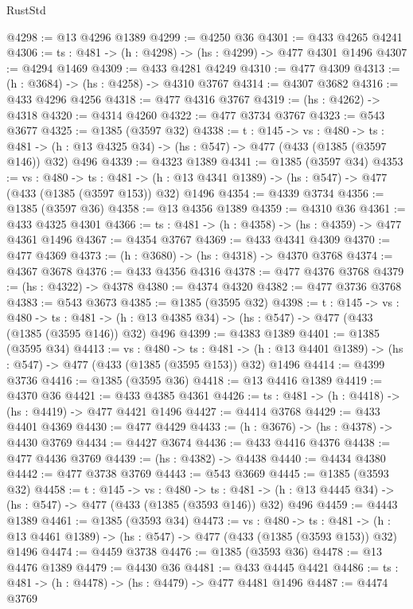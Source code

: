\begin{lexlean}{RustStd}
\begin{coremodule}
{\begin{coremodule}
{{{{{{{{{{{{{{{{@4298 := @13 @4296 @1389
@4299 := @4250 @36
@4301 := @433 @4265 @4241
@4306 := {ts : @481} -> (h : @4298) -> (hs : @4299) -> @477 @4301 @1496
@4307 := @4294 @1469
@4309 := @433 @4281 @4249
@4310 := @477 @4309
@4313 := (h : @3684) -> (hs : @4258) -> @4310 @3767
@4314 := @4307 @3682
@4316 := @433 @4296 @4256
@4318 := @477 @4316 @3767
@4319 := (hs : @4262) -> @4318
@4320 := @4314 @4260
@4322 := @477 @3734 @3767
@4323 := @543 @3677
@4325 := @1385 (@3597 @32)
@4338 := {t : @145} ->
  {vs : @480} ->
  {ts : @481} -> (h : @13 @4325 @34) -> (hs : @547) -> @477 (@433 (@1385 (@3597 @146)) @32) @496
@4339 := @4323 @1389
@4341 := @1385 (@3597 @34)
@4353 := {vs : @480} ->
  {ts : @481} -> (h : @13 @4341 @1389) -> (hs : @547) -> @477 (@433 (@1385 (@3597 @153)) @32) @1496
@4354 := @4339 @3734
@4356 := @1385 (@3597 @36)
@4358 := @13 @4356 @1389
@4359 := @4310 @36
@4361 := @433 @4325 @4301
@4366 := {ts : @481} -> (h : @4358) -> (hs : @4359) -> @477 @4361 @1496
@4367 := @4354 @3767
@4369 := @433 @4341 @4309
@4370 := @477 @4369
@4373 := (h : @3680) -> (hs : @4318) -> @4370 @3768
@4374 := @4367 @3678
@4376 := @433 @4356 @4316
@4378 := @477 @4376 @3768
@4379 := (hs : @4322) -> @4378
@4380 := @4374 @4320
@4382 := @477 @3736 @3768
@4383 := @543 @3673
@4385 := @1385 (@3595 @32)
@4398 := {t : @145} ->
  {vs : @480} ->
  {ts : @481} -> (h : @13 @4385 @34) -> (hs : @547) -> @477 (@433 (@1385 (@3595 @146)) @32) @496
@4399 := @4383 @1389
@4401 := @1385 (@3595 @34)
@4413 := {vs : @480} ->
  {ts : @481} -> (h : @13 @4401 @1389) -> (hs : @547) -> @477 (@433 (@1385 (@3595 @153)) @32) @1496
@4414 := @4399 @3736
@4416 := @1385 (@3595 @36)
@4418 := @13 @4416 @1389
@4419 := @4370 @36
@4421 := @433 @4385 @4361
@4426 := {ts : @481} -> (h : @4418) -> (hs : @4419) -> @477 @4421 @1496
@4427 := @4414 @3768
@4429 := @433 @4401 @4369
@4430 := @477 @4429
@4433 := (h : @3676) -> (hs : @4378) -> @4430 @3769
@4434 := @4427 @3674
@4436 := @433 @4416 @4376
@4438 := @477 @4436 @3769
@4439 := (hs : @4382) -> @4438
@4440 := @4434 @4380
@4442 := @477 @3738 @3769
@4443 := @543 @3669
@4445 := @1385 (@3593 @32)
@4458 := {t : @145} ->
  {vs : @480} ->
  {ts : @481} -> (h : @13 @4445 @34) -> (hs : @547) -> @477 (@433 (@1385 (@3593 @146)) @32) @496
@4459 := @4443 @1389
@4461 := @1385 (@3593 @34)
@4473 := {vs : @480} ->
  {ts : @481} -> (h : @13 @4461 @1389) -> (hs : @547) -> @477 (@433 (@1385 (@3593 @153)) @32) @1496
@4474 := @4459 @3738
@4476 := @1385 (@3593 @36)
@4478 := @13 @4476 @1389
@4479 := @4430 @36
@4481 := @433 @4445 @4421
@4486 := {ts : @481} -> (h : @4478) -> (hs : @4479) -> @477 @4481 @1496
@4487 := @4474 @3769
}}}}}}}}}}}}}}}}
\end{coremodule}}
\end{coremodule}
\end{lexlean}
